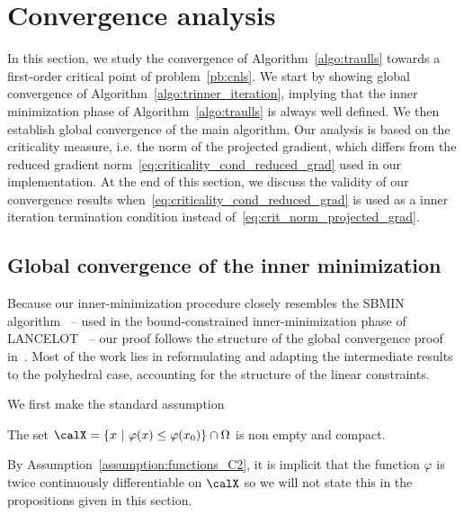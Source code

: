 \section{Convergence analysis}\label{sec:convergence_analysis}

In this section, we study the convergence of Algorithm~\ref{algo:traulls} towards a first-order critical point of problem~\eqref{pb:cnls}. We start by showing global convergence of Algorithm~\ref{algo:trinner_iteration}, implying that the inner minimization phase of Algorithm~\ref{algo:traulls} is always well defined. We then establish global convergence of the main algorithm. Our analysis is based on the criticality measure, i.e. the norm of the projected gradient, which differs from the reduced gradient norm~\eqref{eq:criticality_cond_reduced_grad} used in our implementation. At the end of this section, we discuss the validity of our convergence results when~\eqref{eq:criticality_cond_reduced_grad} is used as a inner iteration termination condition instead of~\eqref{eq:crit_norm_projected_grad}.

\subsection{Global convergence of the inner minimization}

Because our inner-minimization procedure closely resembles the SBMIN algorithm~\cite{conn-etal:1988b} -- used in the bound-constrained inner-minimization phase of LANCELOT~\cite{conn-etal:1992} -- our proof follows the structure of the global convergence proof in~\cite{conn-etal:1988a}. Most of the work lies in reformulating and adapting the intermediate results to the polyhedral case, accounting for the structure of the linear constraints.

We first make the standard assumption
\begin{assumption}\label{assumption:inner_iterates_compact}
	The set $\calX = \left\{x \ | \ \varphi(x) \le \varphi(x_0)\right\} \cap \Omega$ is non empty and compact.
\end{assumption}
By Assumption~\ref{assumption:functions_C2}, it is implicit that the function $\varphi$ is twice continuously differentiable on $\calX$ so we will not state this in the propositions given in this section.

